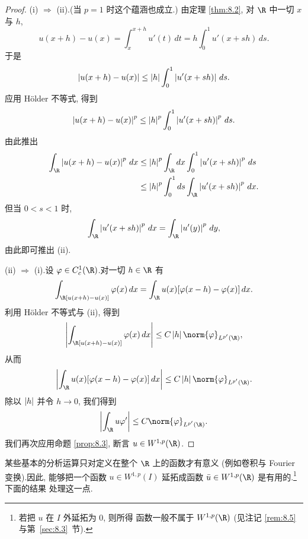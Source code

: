 \begin{proof}
(i) $\Rightarrow$ (ii).(当 $p=1$ 时这个蕴涵也成立.) 由定理  \ref{thm:8.2},
对 $\R$ 中一切 $x$ 与 $h$,
\begin{equation*}
u(x+h)-u(x)=\int_x^{x+h}u'(t)\,dt=h\int_0^1u'(x+sh)\,ds.
\end{equation*}
于是
\begin{equation*}
\left|u(x+h)-u(x)\right|\le\left|h\right|\int_0^1\left|u'(x+sh)\right|\,ds.
\end{equation*}
应用 Hölder 不等式, 得到
\begin{equation*}
\left|u(x+h)-u(x)\right|^p\le\left|h\right|^p\int_0^1\left|u'(x+sh)\right|^p\,ds.
\end{equation*}
由此推出
\begin{equation*}
\begin{aligned}
\int_\R\abs{u(x+h)-u(x)}^p\,dx
&\le\abs{h}^p\int_\R dx\int_0^1\abs{u'(x+sh)}^p\,ds\\
&\le\abs{h}^p\int_0^1ds\int_\R\abs{u'(x+sh)}^p\,dx.
\end{aligned}
\end{equation*}
但当 $0<s<1$ 时,
\begin{equation*}
\int_\R\abs{u'(x+sh)}^p\,dx=\int_\R\abs{u'(y)}^p\,dy,
\end{equation*}
由此即可推出 (ii).

(ii) $\Rightarrow$ (i).设 $\varphi\in C_c^1(\R)$.对一切 $h\in\R$ 有
\begin{equation*}
\int_\R[u(x+h)-u(x)]\varphi(x)\,dx=\int_\R u(x)[\varphi(x-h)-\varphi(x)]\,dx.
\end{equation*}
利用 Hölder 不等式与 (ii), 得到
\begin{equation*}
\abs{\int_\R[u(x+h)-u(x)]\varphi(x)\,dx}\le C\abs{h}\norm{\varphi}_{L^{p'}(\R)},
\end{equation*}
从而
\begin{equation*}
\abs{\int_\R u(x)[\varphi(x-h)-\varphi(x)]\,dx}\le C\abs{h}\norm{\varphi}_{L^{p'}(\R)}.
\end{equation*}
除以 $\left|h\right|$ 并令 $h\to0$, 我们得到
\begin{equation*}
\abs{\int_\R u\varphi'}\le C\norm{\varphi}_{L^{p'}(\R)}.
\end{equation*}
我们再次应用命题  \ref{prop:8.3}, 断言 $u\in W^{1,p}(\R)$.
\end{proof}

某些基本的分析运算只对定义在整个 $\R$ 上的函数才有意义 (例如卷积与 Fourier
变换).因此, 能够把一个函数 $u\in W^{1,p}(I)$ 延拓成函数
$\bar u\in W^{1,p}(\R)$ 是有用的.\footnote{若把 $u$ 在 $I$ 外延拓为 $0$, 则所得
函数一般不属于 $W^{1,p}(\R)$ (见注记 \ref{rem:8.5} 与第~\ref{sec:8.3}~节).} 下面的结果
处理这一点.

